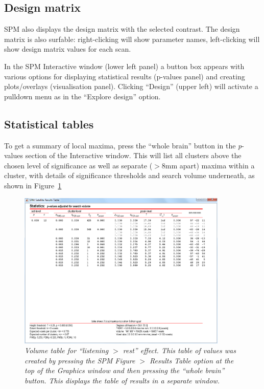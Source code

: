 \subsection{Design matrix}

SPM also displays the design matrix with the selected contrast. The design matrix is also surfable: right-clicking will show parameter names, left-clicking will show design matrix values for each scan. 

In the SPM Interactive window (lower left panel) a button box appears with various options for displaying statistical results (p-values panel) and creating plots/overlays (visualisation panel). Clicking ``Design'' (upper left) will activate a pulldown menu as in the ``Explore design'' option.

\subsection{Statistical tables}

To get a summary of local maxima, press the ``whole brain'' button in the \textit{p}-values section of the Interactive window. This will list all clusters above the chosen level of significance as well as separate ($>$8mm apart) maxima within a cluster, with details of significance thresholds and search volume underneath, as shown in Figure~\ref{aud_volume}

\begin{figure}
\begin{center}
\includegraphics[width=100mm]{auditory/volume}
\caption{\em Volume table for ``listening $>$ rest'' effect. This table of values was created by pressing the SPM Figure $>$ Results Table option at the top of the Graphics window and then pressing the ``whole brain'' button. This displays the table of results in a separate window. \label{aud_volume}}
\end{center}
\end{figure}

